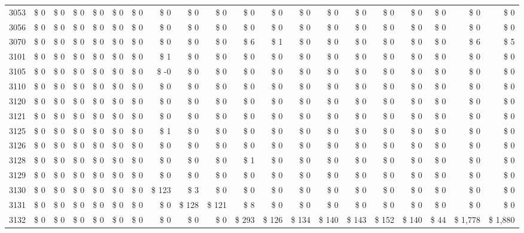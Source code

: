 \begin{longtable}{lrrrrrrrrrrrrrrrrrrr}
3053 & \$ 0 & \$ 0 & \$ 0 & \$ 0 & \$ 0 & \$ 0 & \$ 0 & \$ 0 & \$ 0 & \$ 0 & \$ 0 & \$ 0 & \$ 0 & \$ 0 & \$ 0 & \$ 0 & \$ 0 & \$ 0 & \$ 0 \\
3056 & \$ 0 & \$ 0 & \$ 0 & \$ 0 & \$ 0 & \$ 0 & \$ 0 & \$ 0 & \$ 0 & \$ 0 & \$ 0 & \$ 0 & \$ 0 & \$ 0 & \$ 0 & \$ 0 & \$ 0 & \$ 0 & \$ 0 \\
3070 & \$ 0 & \$ 0 & \$ 0 & \$ 0 & \$ 0 & \$ 0 & \$ 0 & \$ 0 & \$ 0 & \$ 6 & \$ 1 & \$ 0 & \$ 0 & \$ 0 & \$ 0 & \$ 0 & \$ 0 & \$ 6 & \$ 5 \\
3101 & \$ 0 & \$ 0 & \$ 0 & \$ 0 & \$ 0 & \$ 0 & \$ 1 & \$ 0 & \$ 0 & \$ 0 & \$ 0 & \$ 0 & \$ 0 & \$ 0 & \$ 0 & \$ 0 & \$ 0 & \$ 0 & \$ 0 \\
3105 & \$ 0 & \$ 0 & \$ 0 & \$ 0 & \$ 0 & \$ 0 & \$ -0 & \$ 0 & \$ 0 & \$ 0 & \$ 0 & \$ 0 & \$ 0 & \$ 0 & \$ 0 & \$ 0 & \$ 0 & \$ 0 & \$ 0 \\
3110 & \$ 0 & \$ 0 & \$ 0 & \$ 0 & \$ 0 & \$ 0 & \$ 0 & \$ 0 & \$ 0 & \$ 0 & \$ 0 & \$ 0 & \$ 0 & \$ 0 & \$ 0 & \$ 0 & \$ 0 & \$ 0 & \$ 0 \\
3120 & \$ 0 & \$ 0 & \$ 0 & \$ 0 & \$ 0 & \$ 0 & \$ 0 & \$ 0 & \$ 0 & \$ 0 & \$ 0 & \$ 0 & \$ 0 & \$ 0 & \$ 0 & \$ 0 & \$ 0 & \$ 0 & \$ 0 \\
3121 & \$ 0 & \$ 0 & \$ 0 & \$ 0 & \$ 0 & \$ 0 & \$ 0 & \$ 0 & \$ 0 & \$ 0 & \$ 0 & \$ 0 & \$ 0 & \$ 0 & \$ 0 & \$ 0 & \$ 0 & \$ 0 & \$ 0 \\
3125 & \$ 0 & \$ 0 & \$ 0 & \$ 0 & \$ 0 & \$ 0 & \$ 1 & \$ 0 & \$ 0 & \$ 0 & \$ 0 & \$ 0 & \$ 0 & \$ 0 & \$ 0 & \$ 0 & \$ 0 & \$ 0 & \$ 0 \\
3126 & \$ 0 & \$ 0 & \$ 0 & \$ 0 & \$ 0 & \$ 0 & \$ 0 & \$ 0 & \$ 0 & \$ 0 & \$ 0 & \$ 0 & \$ 0 & \$ 0 & \$ 0 & \$ 0 & \$ 0 & \$ 0 & \$ 0 \\
3128 & \$ 0 & \$ 0 & \$ 0 & \$ 0 & \$ 0 & \$ 0 & \$ 0 & \$ 0 & \$ 0 & \$ 1 & \$ 0 & \$ 0 & \$ 0 & \$ 0 & \$ 0 & \$ 0 & \$ 0 & \$ 0 & \$ 0 \\
3129 & \$ 0 & \$ 0 & \$ 0 & \$ 0 & \$ 0 & \$ 0 & \$ 0 & \$ 0 & \$ 0 & \$ 0 & \$ 0 & \$ 0 & \$ 0 & \$ 0 & \$ 0 & \$ 0 & \$ 0 & \$ 0 & \$ 0 \\
3130 & \$ 0 & \$ 0 & \$ 0 & \$ 0 & \$ 0 & \$ 0 & \$ 123 & \$ 3 & \$ 0 & \$ 0 & \$ 0 & \$ 0 & \$ 0 & \$ 0 & \$ 0 & \$ 0 & \$ 0 & \$ 0 & \$ 0 \\
3131 & \$ 0 & \$ 0 & \$ 0 & \$ 0 & \$ 0 & \$ 0 & \$ 0 & \$ 128 & \$ 121 & \$ 8 & \$ 0 & \$ 0 & \$ 0 & \$ 0 & \$ 0 & \$ 0 & \$ 0 & \$ 0 & \$ 0 \\
3132 & \$ 0 & \$ 0 & \$ 0 & \$ 0 & \$ 0 & \$ 0 & \$ 0 & \$ 0 & \$ 0 & \$ 293 & \$ 126 & \$ 134 & \$ 140 & \$ 143 & \$ 152 & \$ 140 & \$ 44 & \$ 1,778 & \$ 1,880 \\

\end{longtable}
